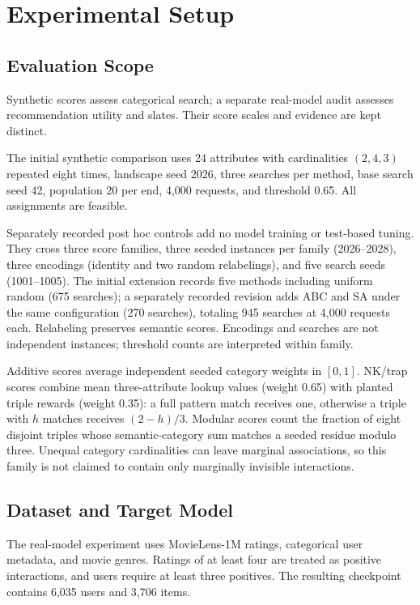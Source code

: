 \documentclass[sigconf,nonacm]{acmart}
\begin{document}
\section{Experimental Setup}
\label{sec:experimental-setup}

\subsection{Evaluation Scope}
Synthetic scores assess categorical search; a separate real-model audit assesses recommendation utility and slates. Their score scales and evidence are kept distinct.

The initial synthetic comparison uses 24 attributes with cardinalities $(2,4,3)$ repeated eight times, landscape seed 2026, three searches per method, base search seed 42, population 20 per end, 4,000 requests, and threshold 0.65. All assignments are feasible.

Separately recorded post hoc controls add no model training or test-based tuning. They cross three score families, three seeded instances per family (2026--2028), three encodings (identity and two random relabelings), and five search seeds (1001--1005). The initial extension records five methods including uniform random (675 searches); a separately recorded revision adds ABC and SA under the same configuration (270 searches), totaling 945 searches at 4,000 requests each. Relabeling preserves semantic scores. Encodings and searches are not independent instances; threshold counts are interpreted within family.

Additive scores average independent seeded category weights in $[0,1]$. NK/trap scores combine mean three-attribute lookup values (weight 0.65) with planted triple rewards (weight 0.35): a full pattern match receives one, otherwise a triple with $h$ matches receives $(2-h)/3$. Modular scores count the fraction of eight disjoint triples whose semantic-category sum matches a seeded residue modulo three. Unequal category cardinalities can leave marginal associations, so this family is not claimed to contain only marginally invisible interactions.

\subsection{Dataset and Target Model}
The real-model experiment uses MovieLens-1M ratings, categorical user metadata, and movie genres. Ratings of at least four are treated as positive interactions, and users require at least three positives. The resulting checkpoint contains 6,035 users and 3,706 items.
\end{document}
